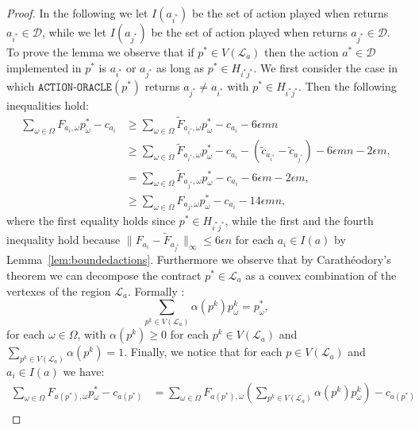\begin{proof}
    In the following we let $I(a_{i^*})$ be the set of action played when \ActionOracle returns $a_{i^*} \in \mathcal{D}$, while we let $I(a_{j^*})$ be the set of action played when \ActionOracle returns $a_{j^*} \in \mathcal{D}$. To prove the lemma we observe that if $p^* \in V(\mathcal{L}_{a})$ then the action $a^* \in \mathcal{D}$ implemented in $p^*$ is $a_{i^*}$ or $a_{j^*}$ as long as $p^* \in H_{i^*j^*}$. We first consider the case in which $\texttt{ACTION-ORACLE}(p^*)$ returns $a_{j^*} \ne a_{i^*}$ with $p^* \in H_{i^*j^*}$. Then the following inequalities hold:
    \begin{align}\label{eq:epsilon_br}
       \sum_{\omega \in \Omega} {F}_{a_i,\omega} p^*_{\omega} - {c}_{a_i} & \ge \sum_{\omega \in \Omega} \widetilde{F}_{a_{i^*},\omega} p^*_{\omega} - {c}_{a_{i}}  - 6 \epsilon m n \\
       & \ge \sum_{\omega \in \Omega} \widetilde{F}_{a_{i^*},\omega}  p^*_{\omega} - {c}_{a_{i}} - (\widetilde{c}_{a_{i^*}} - \widetilde{c}_{a_{j^*}} ) - 6 \epsilon m n - 2\epsilon m, \\
       & = \sum_{\omega \in \Omega} \widetilde{F}_{a_{j^*},\omega}  p^*_{\omega} -  c_{a_i} - 6 \epsilon m  - 2\epsilon m, \\
       & \ge \sum_{\omega \in \Omega} {F}_{a_{j},\omega}  p^*_{\omega}  -  c_{a_i} -14\epsilon m n, 
     \end{align}
where the first equality holds since $p^* \in H_{i^*j^*}$, while the first and the fourth inequality hold because $\| F_{a_i} - \widetilde{F}_{a_{j^*}}\|_{\infty} \le 6 \epsilon n$ for each $a_i \in I(a)$ by Lemma~\ref{lem:boundedactions}. Furthermore we observe that by Carathéodory's theorem we can decompose the contract $p^{*} \in \mathcal{L}_{a}$ as a convex combination of the vertexes of the region $\mathcal{L}_{a}$. Formally :
\begin{equation}\label{eq:pstar}
    \sum_{p^k \in V(\mathcal{L}_{a}) } \alpha(p^{k}) p^{k}_\omega = p^{*}_\omega,
\end{equation}
 for each $\omega \in \Omega$, with $\alpha(p^{k}) \ge 0$ for each $p^{k} \in V(\mathcal{L}_{a}) $ and $\sum_{p^{k} \in V(\mathcal{L}_{a})} \alpha(p^{k}) = 1$. Finally, we notice that for each $p \in V(\mathcal{L}_{a})$ and $a_i \in I(a)$ we have:
\begin{align*}
     \sum_{\omega  \in \Omega }  F_{a(p^*),\omega}  {p}^*_\omega - c_{a(p^*)} & =  \sum_{\omega  \in \Omega } F_{a(p^*),\omega}  \left( \sum_{p^k \in V(\mathcal{L}_{a}) } \alpha(p^k) p^k_\omega \right) - c_{a(p^*)} \\

\end{align*}
\end{proof}

